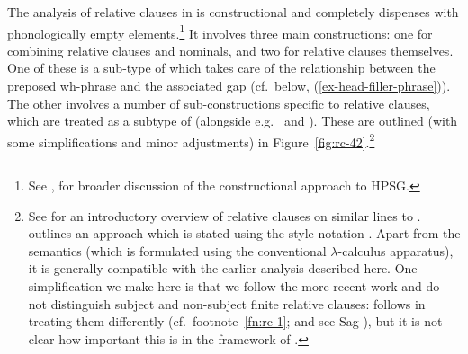 \documentclass[output=paper
 	        ,biblatex
                ,babelshorthands
                ,newtxmath
                ,draftmode
                ,colorlinks, citecolor=brown
]{langscibook}
\begin{document}
The analysis of  relative clauses in  is constructional and completely
dispenses with phonologically empty elements.\footnote{See , for
    broader discussion of the constructional approach to HPSG.} It involves three main constructions: one
for combining relative clauses and nominals, and two for relative clauses themselves. One of these
is a sub-type of  which takes care of the relationship between the preposed wh-phrase
and the associated gap (cf.\ below, (\ref{ex-head-filler-phrase})). The other involves a
number of sub-constructions specific to relative clauses, which are treated as a subtype
of  (alongside e.g.\  and ). These
are outlined (with some simplifications and minor adjustments) in
Figure~\ref{fig:rc-42}.\footnote{See  for an introductory
  overview of  relative clauses on similar lines to
  . \citet[521--524]{Sag:10b} outlines an approach which is stated using the
   style notation \citep{BS2012a-ed}. Apart from the
  semantics (which is formulated using the conventional $\lambda$-calculus apparatus), it is
  generally compatible with the earlier analysis described here.  One simplification we
  make here is that we follow the more recent work \citep[e.g.][523]{Sag:10b} and do not
  distinguish subject and non-subject finite relative clauses: \citet{Sag:97} follows
  \citet[Chapter~5]{Pollard:Sag:94} in treating them differently (cf.\ footnote~\ref{fn:rc-1}; and see
  Sag \citeyear[452--454]{Sag:97}), but it is not clear how important this is in the
  framework of \citet{Sag:97}.}
\end{document}
